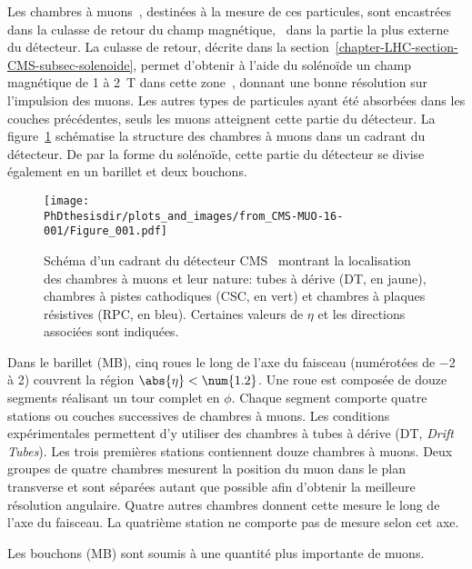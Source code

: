 \par Les chambres à muons~\cite{cms_paper,CERN-LHCC-97-032,CMS-MUO-11-001,CMS-MUO-16-001}, destinées à la mesure de ces particules, sont encastrées dans la culasse de retour du champ magnétique, \ie\ dans la partie la plus externe du détecteur.
La culasse de retour, décrite dans la section~\ref{chapter-LHC-section-CMS-subsec-solenoide}, permet d'obtenir à l'aide du solénoïde un champ magnétique de \num{1} à \SI{2}{\tesla} dans cette zone~\cite{CMS_magnetic_field}, donnant une bonne résolution sur l'impulsion des muons.
Les autres types de particules ayant été absorbées dans les couches précédentes, seuls les muons atteignent cette partie du détecteur.
La figure~\ref{fig-chapter-LHC-section-CMS-subsec-muons-CMS-MUO-16-001-Figure_001} schématise la structure des chambres à muons dans un cadrant du détecteur.
De par la forme du solénoïde, cette partie du détecteur se divise également en un barillet et deux bouchons.
\begin{figure}[h]
\centering
\texttt{[image: \\PhDthesisdir/plots\_and\_images/from\_CMS-MUO-16-001/Figure\_001.pdf]}
\caption[Schéma des chambres à muons de CMS.]{Schéma d'un cadrant du détecteur CMS~\cite{CMS-MUO-16-001} montrant la localisation des chambres à muons et leur nature: tubes à dérive (DT, en jaune), chambres à pistes cathodiques (CSC, en vert) et chambres à plaques résistives (RPC, en bleu). Certaines valeurs de $\eta$ et les directions associées sont indiquées.}
\label{fig-chapter-LHC-section-CMS-subsec-muons-CMS-MUO-16-001-Figure_001}
\end{figure}
\par Dans le barillet (MB), cinq roues le long de l'axe du faisceau (numérotées de \num{-2} à \num{2}) couvrent la région $\abs{\eta}<\num{1.2}$.
Une roue est composée de douze segments réalisant un tour complet en $\phi$.
Chaque segment comporte quatre stations ou couches successives de chambres à muons.
Les conditions expérimentales permettent d'y utiliser des chambres à tubes à dérive (DT, \emph{Drift Tubes}).
Les trois premières stations contiennent douze chambres à muons.
Deux groupes de quatre chambres mesurent la position du muon dans le plan transverse et sont séparées autant que possible afin d'obtenir la meilleure résolution angulaire.
Quatre autres chambres donnent cette mesure le long de l'axe du faisceau.
La quatrième station ne comporte pas de mesure selon cet axe.
\par Les bouchons (MB) sont soumis à une quantité plus importante de muons.
